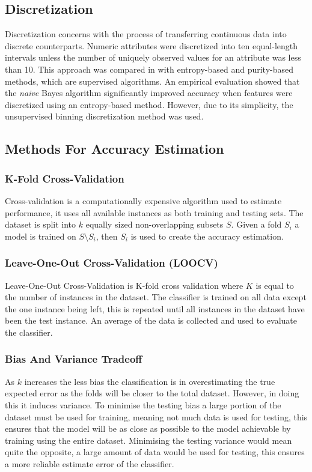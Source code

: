 \documentclass{cmppgr}
\begin{document}
\subsection{Discretization}
Discretization concerns with the process of transferring continuous data into discrete counterparts. Numeric attributes were discretized into ten equal-length intervals unless the number of uniquely observed values for an attribute was less than 10. This approach was compared in \cite{dougherty1995supervised} with entropy-based and purity-based methods, which are supervised algorithms. An empirical evaluation showed that the \textit{naive} Bayes algorithm significantly improved accuracy when features were discretized using an entropy-based method. However, due to its simplicity, the unsupervised binning discretization method was used.

\subsection{Methods For Accuracy Estimation}







\subsubsection{K-Fold Cross-Validation}
Cross-validation is a computationally expensive algorithm used to estimate performance, it uses all available instances as both training and testing sets. The dataset is split into $k$ equally sized non-overlapping subsets $S$. Given a fold $S_i$ a model is trained on $S \setminus S_i$, then $S_i$ is used to create the accuracy estimation.

\subsubsection{Leave-One-Out Cross-Validation (LOOCV)}
Leave-One-Out Cross-Validation is  K-fold cross validation where $K$ is equal to the number of instances in the dataset. The classifier is trained on all data except the one instance being left, this is repeated until all instances in the dataset have been the test instance. An average of the data is collected and used to evaluate the classifier.

\subsubsection{Bias And Variance Tradeoff}
As $k$ increases the less bias the classification is in overestimating the true expected error as the folds will be closer to the total dataset. However, in doing this it induces variance. To minimise the testing bias a large portion of the dataset must be used for training, meaning not much data is used for testing, this ensures that the model will be as close as possible to the model achievable by training using the entire dataset. Minimising the testing variance would mean quite the opposite, a large amount of data would be used for testing, this ensures a more reliable estimate error of the classifier.
	
\end{document}
